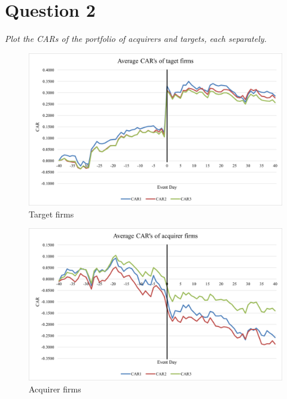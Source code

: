 \section{Question 2}
\textit{Plot the CARs of the portfolio of acquirers and targets, each separately.}\newline
\begin{figure}[H]
    \centering
    \includegraphics[scale=0.75]{images/Bild1.png}
    \caption{Target firms}
    \label{bildlitargets}
\end{figure}
\begin{figure}[H]
    \centering
    \includegraphics[scale=0.75]{images/Bild2.png}
    \caption{Acquirer firms}
    \label{bildlyacqui}
\end{figure}

